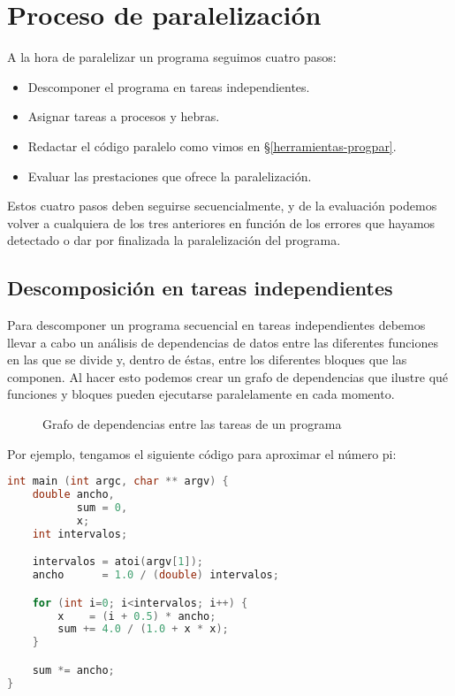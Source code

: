 \section{Proceso de paralelización}\label{proceso-par}

A la hora de paralelizar un programa seguimos cuatro pasos:

\begin{itemize}
	\item Descomponer el programa en tareas independientes.
	\item Asignar tareas a procesos y hebras.
	\item Redactar el código paralelo como vimos en \S\ref{herramientas-progpar}.
	\item Evaluar las prestaciones que ofrece la paralelización.
\end{itemize}

Estos cuatro pasos deben seguirse secuencialmente, y de la evaluación podemos volver a cualquiera de los tres anteriores en función de los errores que hayamos detectado o dar por finalizada la paralelización del programa.

\subsection{Descomposición en tareas independientes}\label{descomposicion-tareas-independientes}

Para descomponer un programa secuencial en tareas independientes debemos llevar a cabo un análisis de dependencias de datos entre las diferentes funciones en las que se divide y, dentro de éstas, entre los diferentes bloques que las componen.
Al hacer esto podemos crear un grafo de dependencias que ilustre qué funciones y bloques pueden ejecutarse paralelamente en cada momento.

\begin{figure}[h]
\begin{center}

\end{center}
\caption{Grafo de dependencias entre las tareas de un programa}
\end{figure}

Por ejemplo, tengamos el siguiente código para aproximar el número pi:

\begin{lstlisting}[language=C]
int main (int argc, char ** argv) {
	double ancho,
	       sum = 0,
	       x;
	int intervalos;

	intervalos = atoi(argv[1]);
	ancho      = 1.0 / (double) intervalos;

	for (int i=0; i<intervalos; i++) {
		x    = (i + 0.5) * ancho;
		sum += 4.0 / (1.0 + x * x);
	}

	sum *= ancho;
}
\end{lstlisting}

